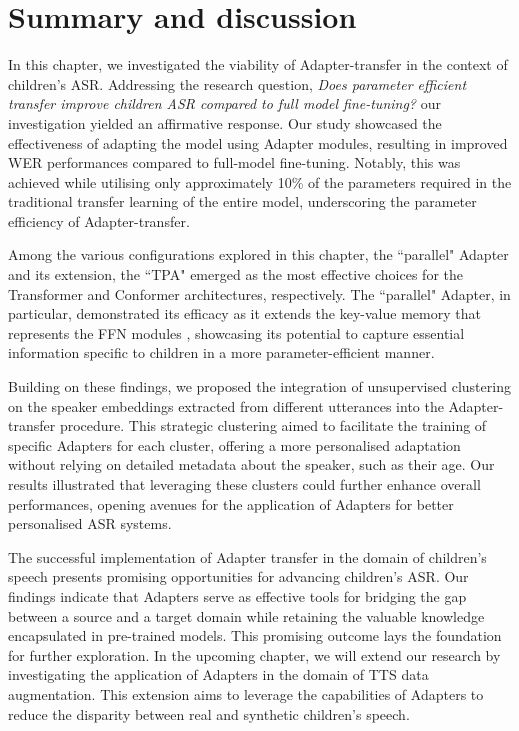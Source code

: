    
\section{Summary and discussion}
In this chapter, we investigated the viability of Adapter-transfer in the context of children's \ac{ASR}. Addressing the research question, \textit{Does parameter efficient transfer improve children \ac{ASR} compared to full model fine-tuning?} our investigation yielded an affirmative response. Our study showcased the effectiveness of adapting the model using Adapter modules, resulting in improved \ac{WER} performances compared to full-model fine-tuning. Notably, this was achieved while utilising only approximately 10\% of the parameters required in the traditional transfer learning of the entire model, underscoring the parameter efficiency of Adapter-transfer.
 
Among the various configurations explored in this chapter, the ``parallel" Adapter and its extension, the ``\ac{TPA}" emerged as the most effective choices for the Transformer and Conformer architectures, respectively. The ``parallel" Adapter, in particular, demonstrated its efficacy as it extends the key-value memory that represents the \ac{FFN} modules \cite{geva2020transformer}, showcasing its potential to capture essential information specific to children in a more parameter-efficient manner.

Building on these findings, we proposed the integration of unsupervised clustering on the speaker embeddings extracted from different utterances into the Adapter-transfer procedure. This strategic clustering aimed to facilitate the training of specific Adapters for each cluster, offering a more personalised adaptation without relying on detailed metadata about the speaker, such as their age. Our results illustrated that leveraging these clusters could further enhance overall performances, opening avenues for the application of Adapters for better personalised \ac{ASR} systems.


The successful implementation of Adapter transfer in the domain of children's speech presents promising opportunities for advancing children's \ac{ASR}. Our findings indicate that Adapters serve as effective tools for bridging the gap between a source and a target domain while retaining the valuable knowledge encapsulated in pre-trained models. This promising outcome lays the foundation for further exploration. In the upcoming chapter, we will extend our research by investigating the application of Adapters in the domain of \ac{TTS} data augmentation. This extension aims to leverage the capabilities of Adapters to reduce the disparity between real and synthetic children's speech.

